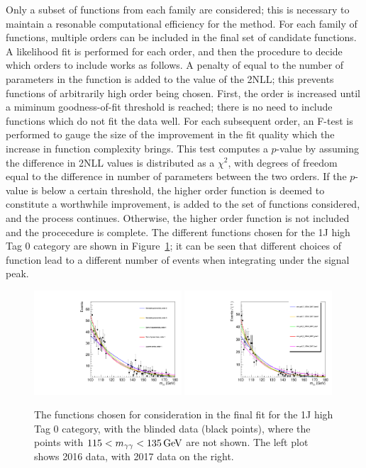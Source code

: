 Only a subset of functions from each family are considered;
this is necessary to maintain a resonable computational efficiency for the method.
For each family of functions, multiple orders can be included in the final set of candidate functions.
A likelihood fit is performed for each order, 
and then the procedure to decide which orders to include works as follows.
A penalty of equal to the number of parameters in the function is added to the value of the 2NLL;
this prevents functions of arbitrarily high order being chosen.
First, the order is increased until a miminum goodness-of-fit threshold is reached;
there is no need to include functions which do not fit the data well. %
For each subsequent order, an F-test \cite{Fisher} is performed to gauge the size of the improvement in the fit
quality which the increase in function complexity brings.
This test computes a $p$-value by assuming the difference in 2NLL values 
is distributed as a $\chi^2$, with degrees of freedom equal to 
the difference in number of parameters between the two orders.
If the $p$-value is below a certain threshold, %
the higher order function is deemed to constitute a worthwhile improvement, 
is added to the set of functions considered, and the process continues.
Otherwise, the higher order function is not included and the procecedure is complete.
The different functions chosen for the 1J high Tag 0 category 
are shown in Figure~\ref{fig:sigbkg_functions};
it can be seen that different choices of function lead to a different number of events 
when integrating under the signal peak.

\begin{figure}[hptb]
\centering
\includegraphics[width=0.49\textwidth]{Figures/SigBkg/allPdfs_RECO_1J_PTH_120_200_Tag0_2016.pdf}
\includegraphics[width=0.49\textwidth]{Figures/SigBkg/allPdfs_RECO_1J_PTH_120_200_Tag0_2017.pdf}
\caption{
The functions chosen for consideration in the final fit for the 1J high Tag 0 category, 
with the blinded data (black points), 
where the points with $115 < m_{\gamma\gamma} < \SI{135}{GeV}$ are not shown.
The left plot shows 2016 data, with 2017 data on the right.
}
\label{fig:sigbkg_functions}
\end{figure}

